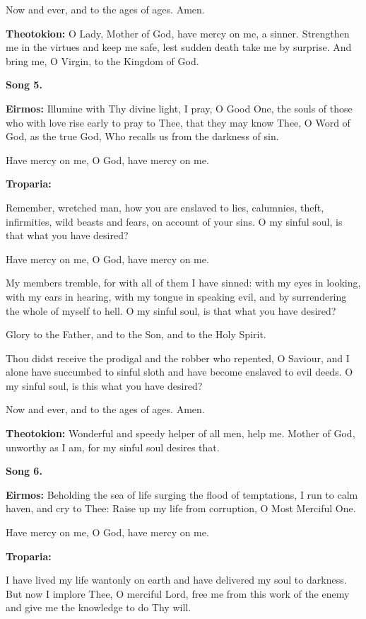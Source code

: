 Now and ever, and to the ages of ages. Amen.

\textbf{Theotokion:} O Lady, Mother of God, have mercy on me, a sinner.
Strengthen me in the virtues and keep me safe, lest sudden death take me
by surprise. And bring me, O Virgin, to the Kingdom of God.

\textbf{Song 5.}

\textbf{Eirmos:} Illumine with Thy divine light, I pray, O Good One, the
souls of those who with love rise early to pray to Thee, that they may
know Thee, O Word of God, as the true God, Who recalls us from the
darkness of sin.

Have mercy on me, O God, have mercy on me.

\textbf{Troparia:}

Remember, wretched man, how you are enslaved to lies, calumnies, theft,
infirmities, wild beasts and fears, on account of your sins. O my sinful
soul, is that what you have desired?

Have mercy on me, O God, have mercy on me.

My members tremble, for with all of them I have sinned: with my eyes in
looking, with my ears in hearing, with my tongue in speaking evil, and
by surrendering the whole of myself to hell. O my sinful soul, is that
what you have desired?

Glory to the Father, and to the Son, and to the Holy Spirit.

Thou didst receive the prodigal and the robber who repented, O Saviour,
and I alone have succumbed to sinful sloth and have become enslaved to
evil deeds. O my sinful soul, is this what you have desired?

Now and ever, and to the ages of ages. Amen.

\textbf{Theotokion:} Wonderful and speedy helper of all men, help me.
Mother of God, unworthy as I am, for my sinful soul desires that.

\textbf{Song 6.}

\textbf{Eirmos:} Beholding the sea of life surging the flood of
temptations, I run to calm haven, and cry to Thee: Raise up my life from
corruption, O Most Merciful One.

Have mercy on me, O God, have mercy on me.

\textbf{Troparia:}

I have lived my life wantonly on earth and have delivered my soul to
darkness. But now I implore Thee, O merciful Lord, free me from this
work of the enemy and give me the knowledge to do Thy will.

